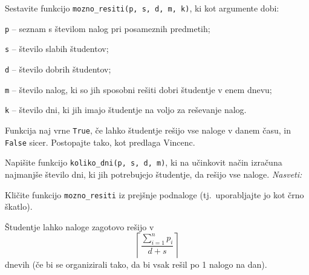 \documentclass[arhiv]{../izpit}
\begin{document}
\podnaloga[15 točk]
Sestavite funkcijo \texttt{mozno\_resiti(p, s, d, m, k)}, ki kot argumente dobi:
\begin{compactitem}
\item \texttt{p} -- seznam s številom nalog pri posameznih predmetih;
\item \texttt{s} -- število slabih študentov;
\item \texttt{d} -- število dobrih študentov;
\item \texttt{m} -- število nalog, ki so jih sposobni rešiti dobri študentje v enem dnevu;
\item \texttt{k} -- število dni, ki jih imajo študentje na voljo za reševanje nalog.
\end{compactitem}
Funkcija naj vrne \texttt{True}, če lahko študentje rešijo vse naloge v danem času, in \texttt{False} sicer. Postopajte tako, kot predlaga Vincenc.


\podnaloga[15 točk]
Napišite funkcijo \texttt{koliko\_dni(p, s, d, m)}, ki na učinkovit način izračuna najmanjše število dni, ki jih potrebujejo študentje, da rešijo vse naloge. 
\emph{Nasveti:}
\begin{compactitem}
\item Kličite funkcijo \texttt{mozno\_resiti} iz prejšnje podnaloge (tj.\ uporabljajte jo kot črno škatlo).
\item Študentje lahko naloge zagotovo rešijo v $$\left\lceil \frac{\sum_{i=1}^{n} p_i }{d + s} \right\rceil$$ dnevih (če bi se organizirali tako, da bi vsak rešil po 1 nalogo na dan).
\end{compactitem}
\end{document}
